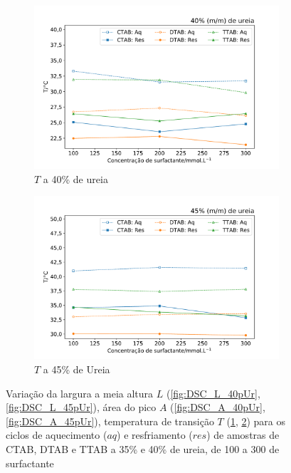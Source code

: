 \begin{figure}[H]
		 	\begin{subfigure}[t]{0.45\textwidth}
		 		\includegraphics[width=\textwidth]{./imagens/dsc/T_40p_1_300_aq_res}
		 		\caption{$T$ a 40\% de ureia}
		 		\label{fig:DSC_T_40pUr}
		 	\end{subfigure} \qquad %
		 	\begin{subfigure}[t]{0.45\textwidth}
		 		\includegraphics[width=\textwidth]{./imagens/dsc/T_45p_1_300_aq_res}
		 		\caption{$T$ a 45\% de Ureia}
		 		\label{fig:DSC_T_45pUr}
		 	\end{subfigure}
	 	
		 	\caption{Variação da largura a meia altura $L$ (\ref{fig:DSC_L_40pUr}, \ref{fig:DSC_L_45pUr}), área do pico $A$ (\ref{fig:DSC_A_40pUr}, \ref{fig:DSC_A_45pUr}), temperatura de transição $T$ (\ref{fig:DSC_T_40pUr}, \ref{fig:DSC_T_45pUr}) para os ciclos de aquecimento ($aq$) e resfriamento ($res$) de amostras de CTAB, DTAB e TTAB a 35\% e 40\% de ureia, de 100 a 300 \mM{} de surfactante}
		 	\label{fig:DSC_propriedades_surf_40_45}
		 \end{figure}
		
